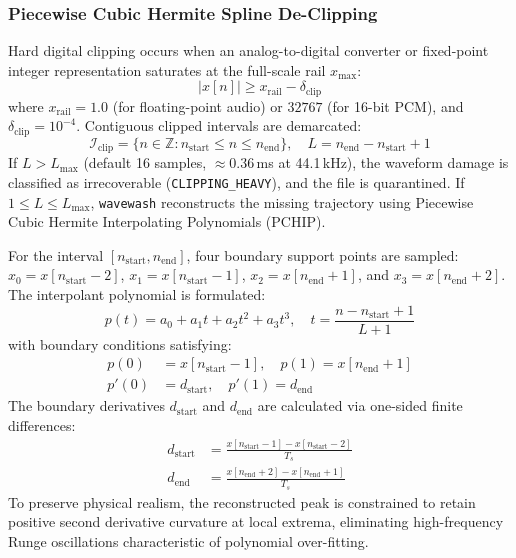 \documentclass[10pt,journal,compsoc]{IEEEtran}
\begin{document}
\subsubsection{Piecewise Cubic Hermite Spline De-Clipping}
Hard digital clipping occurs when an analog-to-digital converter or fixed-point integer representation saturates at the full-scale rail $x_{\max}$:
\begin{equation}
|x[n]| \ge x_{\text{rail}} - \delta_{\text{clip}}
\label{eq:clip_thresh}
\end{equation}
where $x_{\text{rail}} = 1.0$ (for floating-point audio) or $32767$ (for 16-bit PCM), and $\delta_{\text{clip}} = 10^{-4}$. Contiguous clipped intervals are demarcated:
\begin{equation}
\mathcal{I}_{\text{clip}} = \{n \in \mathbb{Z} : n_{\text{start}} \le n \le n_{\text{end}}\}, \quad L = n_{\text{end}} - n_{\text{start}} + 1
\label{eq:clip_interval}
\end{equation}
If $L > L_{\max}$ (default 16 samples, $\approx 0.36$\,ms at 44.1\,kHz), the waveform damage is classified as irrecoverable (\texttt{CLIPPING\_HEAVY}), and the file is quarantined. If $1 \le L \le L_{\max}$, \texttt{wavewash} reconstructs the missing trajectory using Piecewise Cubic Hermite Interpolating Polynomials (PCHIP).

For the interval $[n_{\text{start}}, n_{\text{end}}]$, four boundary support points are sampled: $x_0 = x[n_{\text{start}}-2]$, $x_1 = x[n_{\text{start}}-1]$, $x_2 = x[n_{\text{end}}+1]$, and $x_3 = x[n_{\text{end}}+2]$. The interpolant polynomial is formulated:
\begin{equation}
p(t) = a_0 + a_1 t + a_2 t^2 + a_3 t^3, \quad t = \frac{n - n_{\text{start}} + 1}{L + 1}
\label{eq:pchip}
\end{equation}
with boundary conditions satisfying:
\begin{align}
p(0) &= x[n_{\text{start}}-1], \quad p(1) = x[n_{\text{end}}+1] \\
p'(0) &= d_{\text{start}}, \quad p'(1) = d_{\text{end}}
\end{align}
The boundary derivatives $d_{\text{start}}$ and $d_{\text{end}}$ are calculated via one-sided finite differences:
\begin{align}
d_{\text{start}} &= \frac{x[n_{\text{start}}-1] - x[n_{\text{start}}-2]}{T_s} \\
d_{\text{end}} &= \frac{x[n_{\text{end}}+2] - x[n_{\text{end}}+1]}{T_s}
\end{align}
To preserve physical realism, the reconstructed peak is constrained to retain positive second derivative curvature at local extrema, eliminating high-frequency Runge oscillations characteristic of polynomial over-fitting.
\end{document}
